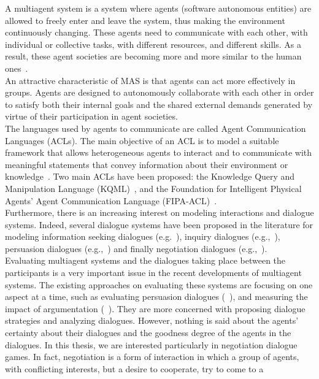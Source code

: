 A multiagent system is a system where agents (software autonomous entities) are allowed to freely enter and leave the
system, thus making the environment continuously changing. These agents need to communicate with each other, with individual or
collective tasks, with different resources, and different skills. As a result, these agent societies are becoming more and more
similar to the human ones~\cite{Falcone99}.\\
An attractive characteristic of MAS is that agents can act more effectively in groups. Agents are designed to
autonomously collaborate with each other in order to satisfy both their internal goals and the shared external demands
generated by virtue of their participation in agent societies. \\
The languages used by agents to communicate are called Agent Communication Languages (ACLs). The main objective of an
ACL is to model a suitable framework that allows heterogeneous agents to interact and to communicate with meaningful
statements that convey information about their environment or knowledge~\cite{Kone00}. Two main ACLs have been proposed:
the Knowledge Query and Manipulation Language (KQML)~\cite{Finin95}, and the Foundation for Intelligent Physical Agents'
Agent Communication Language (FIPA-ACL)~\cite{Fipa01}.\\
Furthermore, there is an increasing interest on modeling interactions and dialogue systems. Indeed, several
dialogue systems have been proposed in the literature for modeling information seeking dialogues (e.g.~\cite{MWParsons03}),
inquiry dialogues (e.g.,~\cite{BlackH07}), persuasion dialogues (e.g.,~\cite{Amgoud00}) and finally negotiation dialogues
(e.g.,~\cite{KSycara90}).\\
Evaluating multiagent systems and the dialogues taking place between the participants is a very important issue in the recent
developments of multiagent systems. The existing approaches on evaluating these systems are focusing on one aspect at a time, such as
evaluating persuasion dialogues (~\cite{Amgoud00}), and measuring the impact of argumentation (~\cite{Hunter04}). They are more concerned
with proposing dialogue strategies and analyzing dialogues. However, nothing is said about the agents' certainty about their dialogues and
the goodness degree of the agents in the dialogues. In this thesis, we are interested particularly in negotiation dialogue games. In fact,
negotiation is a form of interaction in which a group of agents, with conflicting interests, but a desire to cooperate, try to come to a
